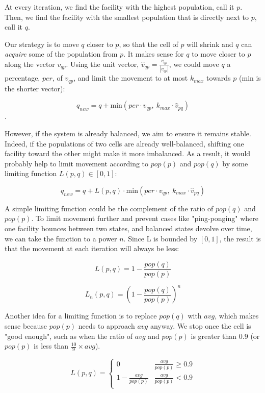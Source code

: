 \documentclass{article}
\begin{document}
At every iteration, we find the facility with the highest population, call it $p$. Then, we find the facility with the smallest population that is directly next to $p$, call it $q$.

Our strategy is to move $q$ closer to $p$, so that the cell of $p$ will shrink and $q$ can \textit{acquire} some of the population from $p$. It makes sense for $q$ to move closer to $p$ along the vector $v_{qp}$. Using the unit vector, $\hat{v}_{qp} = \frac{v_{qp}}{|v_{qp}|}$, we could move $q$ a percentage, $per$, of $v_{qp}$, and limit the movement to at most $k_{max}$ towards $p$ (min is the shorter vector): 

$$q_{new} = q + \mathrm{min} (per\cdot v_{qp},\ k_{max} \cdot \hat{v}_{pq}) $$.

However, if the system is already balanced, we aim to ensure it remains stable. Indeed, if the populations of two cells are already well-balanced, shifting one facility toward the other might make it more imbalanced. As a result, it would probably help to limit movement according to $pop(p)$ and $pop(q)$ by some limiting function $L(p, q) \in [0, 1]$:

$$
q_{new} = q + L(p, q) \cdot \mathrm{min} (per\cdot v_{qp},\ k_{max} \cdot \hat{v}_{pq})
$$

A simple limiting function could be the complement of the ratio of $pop(q)$ and $pop(p)$. To limit movement further and prevent cases like "ping-ponging" where one facility bounces between two states, and balanced states devolve over time, we can take the function to a power $n$. Since L is bounded by $[0, 1]$, the result is that the movement at each iteration will always be less: 

\begin{equation}
L(p, q) = 1 - \frac{pop(q)}{pop(p)}
\end{equation}

\begin{equation}
L_n(p, q) = \left( 1 - \frac{pop(q)}{pop(p)} \right)^n
\end{equation}

Another idea for a limiting function is to replace $pop(q)$ with $avg$, which makes sense because $pop(p)$ needs to approach $avg$ anyway. We stop once the cell is "good enough", such as when the ratio of $avg$ and $pop(p)$ is greater than $0.9$ (or $pop(p)$ is less than $\frac{10}{9} \times avg$).


\begin{equation}
L(p, q) = \begin{cases} 
      0 & \frac{avg}{pop(p)} \geq 0.9 \\
      1 - \frac{avg}{pop(p)} & \frac{avg}{pop(p)} < 0.9 \\
   \end{cases}
\end{equation}
\end{document}
